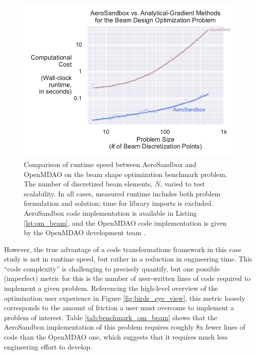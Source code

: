 \begin{figure}[htbp!]
    \centering
    \includegraphics[width=\textwidth]{../figures/benchmark_om_beam.pdf}
    \caption{Comparison of runtime speed between AeroSandbox and OpenMDAO on the beam shape optimization benchmark problem. The number of discretized beam elements, $N$, varied to test scalability. In all cases, measured runtime includes both problem formulation and solution; time for library imports is excluded. AeroSandbox code implementation is available in Listing \ref{lst:om_beam}, and the OpenMDAO code implementation is given by the OpenMDAO development team \cite{om_beam}.}
    \label{fig:benchmark_om_beam}
\end{figure}

However, the true advantage of a code transformations framework in this case study is not in runtime speed, but rather in a reduction in engineering time. This ``code complexity'' is challenging to precisely quantify, but one possible (imperfect) metric for this is the number of user-written lines of code required to implement a given problem. Referencing the high-level overview of the optimization user experience in Figure \ref{fig:birds_eye_view}, this metric loosely corresponds to the amount of friction a user must overcome to implement a problem of interest. Table \ref{tab:benchmark_om_beam} shows that the AeroSandbox implementation of this problem requires roughly 8x fewer lines of code than the OpenMDAO one, which suggests that it requires much less engineering effort to develop.

